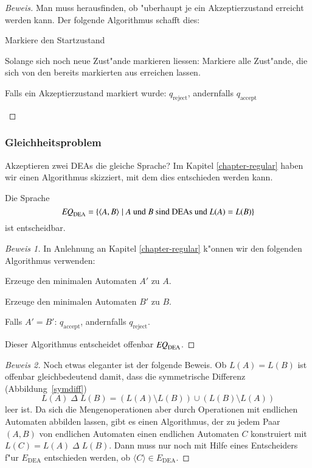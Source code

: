 \begin{proof}[Beweis]
Man muss herausfinden, ob "uberhaupt je ein Akzeptierzustand erreicht
werden kann.
Der folgende Algorithmus schafft dies:
\medskip
\begin{compactenum}
\item Markiere den Startzustand
\item Solange sich noch neue Zust"ande markieren liessen:
 Markiere alle Zust"ande, die sich von den bereits markierten aus
erreichen lassen.
\item Falls ein Akzeptierzustand markiert wurde: $q_{\text{reject}}$,
andernfalls
$q_{\text{accept}}$
\end{compactenum}
\medskip
\end{proof}

\subsubsection{Gleichheitsproblem}
Akzeptieren zwei DEAs die gleiche Sprache? Im Kapitel \ref{chapter-regular}
haben wir einen Algorithmus skizziert, mit dem dies entschieden werden kann.

\begin{satz}
Die Sprache
\[
\text{\it EQ}_{\text{DEA}}=\{
\langle A,B\rangle\;|\;\text{$A$ und $B$ sind DEAs und $L(A)=L(B)$}
\}
\]
ist entscheidbar.
\end{satz}

\begin{proof}[Beweis 1]
In Anlehnung an Kapitel \ref{chapter-regular} k"onnen wir den folgenden
Algorithmus verwenden:
\medskip
\begin{compactenum}
\item Erzeuge den minimalen Automaten $A'$ zu $A$.
\item Erzeuge den minimalen Automaten $B'$ zu $B$.
\item Falls $A'=B'$: $q_{\text{accept}}$, andernfalls $q_{\text{reject}}$.
\end{compactenum}
\medskip
Dieser Algorithmus entscheidet offenbar 
$\text{\it EQ}_{\text{DEA}}$.
\end{proof}

\begin{proof}[Beweis 2]
Noch etwas eleganter ist der folgende Beweis. Ob $L(A)=L(B)$ ist
offenbar gleichbedeutend damit, dass die symmetrische Differenz
(Abbildung~\ref{symdiff})
\[
L(A){\;\Delta\;} L(B)=
(L(A)\setminus L(B)) \cup (L(B)\setminus L(A))
\]
leer ist.
Da sich die Mengenoperationen aber durch Operationen mit
endlichen Automaten abbilden lassen, gibt es einen Algorithmus,
der  zu jedem Paar $(A,B)$
von endlichen Automaten  einen endlichen Automaten $C$ konstruiert mit
$L(C)=L(A){\;\Delta\;} L(B)$. Dann muss nur noch mit Hilfe eines Entscheiders
f"ur $E_{\text{DEA}}$ entschieden werden, ob $\langle C\rangle\in
E_{\text{DEA}}$.
\end{proof}

